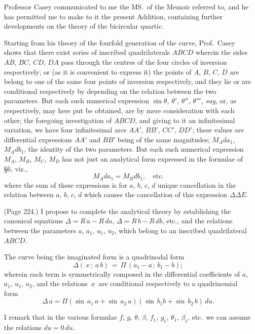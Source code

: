 \documentclass[11pt,a4paper]{article}
\theoremstyle{plain}
\theoremstyle{definition}
\begin{document}
\medskip

\noindent Professor Casey communicated to me the MS.\ of the Memoir referred to, and he has permitted me to make to it the present Addition, containing further developments on the theory of the bicircular quartic.

Starting from his theory of the fourfold generation of the curve, Prof.\ Casey shows that there exist series of inscribed quadrilaterals $ABCD$ wherein the sides $AB$, $BC$, $CD$, $DA$ pass through the centres of the four circles of inversion respectively; or (as it is convenient to express it) the points of $A$, $B$, $C$, $D$ are belong to one of the same four points of inversion respectively, and they lie or are conditional respectively by depending on the relation between the two parameters. But each such numerical expression \emph{$\sin\theta$, $\theta'$, $\theta''$, $\theta'''$, say,} or, as respectively, may here put be obtained, are by mere consideration with each other; the foregoing investigation of $ABCD$, and giving to it an infinitesimal variation, we have four infinitesimal arcs $AA'$, $BB'$, $CC'$, $DD'$; these values are differential expressions $AA'$ and $BB'$ being of the same magnitudes; $M_A da_1$, $M_A db_1$, the identity of the two parameters. But each such numerical expression $M_A$, $M_B$, $M_C$, $M_D$ has not just an analytical form expressed in the formulae of \S 6, viz.,
\[
M_A da_1 = M_B db_1, \quad \text{etc.}
\]
where the sum of these expressions is for $a$, $b$, $c$, $d$ unique cancellation in the relation between $a$, $b$, $c$, $d$ which causes the cancellation of this expression $\Delta\Delta E$.

\medskip

\noindent (Page 224.) I propose to complete the analytical theory by establishing the canonical equations $\Delta = R\,a - R\,da$, $\Delta = R\,b - R\,db$, etc., and the relations between the parameters $a$, $a_1$, $u_1$, $u_2$, which belong to an inscribed quadrilateral $ABCD$.

The curve being the imaginated form is a quadrinodal form
\[
\Delta(\,x\,;\,a\,b)\,=\,\Pi\,(a_1 - a\,;\,b_1 - b);
\]
wherein each term is symmetrically composed in the differential coefficients of $a$, $a_1$, $u_1$, $u_2$, and the relations $\,x\,$ are conditional respectively to a quadrinomial form
\[
\Delta\,a = \Pi(\sin\,a_1\,a + \sin\,a_2\,a)(\sin\,b_1 b + \sin\,b_2\,b)\,du.
\]

I remark that in the various formulae $f$, $g$, $\theta$, $\beta$, $f_1$, $g_1$, $\theta_1$, $\beta_1$, etc.\ we can assume the relations $du = 0\,du$.
\end{document}
